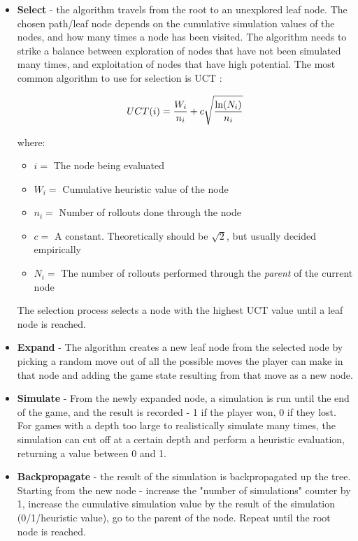 \begin{itemize}
\item \textbf{Select} - the algorithm travels from the root to an unexplored leaf node. The chosen path/leaf node depends on the cumulative simulation values of the nodes, and how many times a node has been visited. The algorithm needs to strike a balance between exploration of nodes that have not been simulated many times, and exploitation of nodes that have high potential. The most common algorithm to use for selection is UCT \cite{kocsis2006bandit}:

\[UCT(i)=\frac{W_i}{n_i}\\+c\sqrt{\frac{\ln(N_i)}{n_i}}\]

where:
\begin{itemize} 
\item \(i = \) The node being evaluated
\item \(W_i = \) Cumulative heuristic value of the node
\item \(n_i = \) Number of rollouts done through the node
\item \(c = \) A constant. Theoretically should be \(\sqrt{2}\), but usually decided empirically
\item \(N_i = \) The number of rollouts performed through the \textit{parent} of the current node
\end{itemize}

The selection process selects a node with the highest UCT value until a leaf node is reached.
\item \textbf{Expand} - The algorithm creates a new leaf node from the selected node by picking a random move out of all the possible moves the player can make in that node and adding the game state resulting from that move as a new node.
\item \textbf{Simulate} - From the newly expanded node, a simulation is run until the end of the game, and the result is recorded - 1 if the player won, 0 if they lost. For games with a depth too large to realistically simulate many times, the simulation can cut off at a certain depth and perform a heuristic evaluation, returning a value between 0 and 1.
\item \textbf{Backpropagate} - the result of the simulation is backpropagated up the tree. Starting from the new node - increase the "number of simulations" counter by 1, increase the cumulative simulation value by the result of the simulation (0/1/heuristic value), go to the parent of the node. Repeat until the root node is reached.
\end{itemize}

